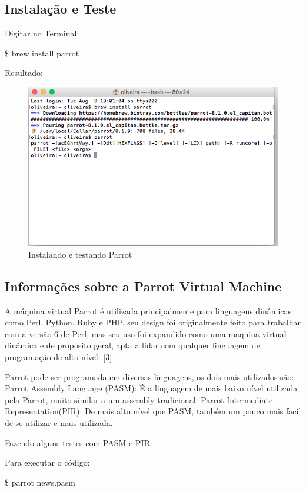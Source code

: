 \documentclass[12pt,a4paper,twoside]{report}
\begin{document}
\subsection{Instalação e Teste}
Digitar no Terminal:
\begin{terminal}
\$ brew install parrot
\end{terminal}
Resultado:
\begin{figure}[!ht]
\centering
\caption{Instalando e testando Parrot}
\includegraphics[scale=0.27]{imagens/brew-parrot.png}
\end{figure}
\subsection{Informações sobre a Parrot Virtual Machine}
A máquina virtual Parrot é utilizada principalmente para linguagens dinâmicas como Perl, Python, Ruby e PHP, seu design
foi originalmente feito para trabalhar com a versão 6 de Perl, mas seu uso foi expandido como uma maquina virtual dinâmica
e de proposito geral, apta a lidar com qualquer linguagem de programação de alto nível. [3]

Parrot pode ser programada em diversas linguagens, os dois mais utilizados são:
Parrot Assembly Language (PASM): É a linguagem de mais baixo nível utilizada pela Parrot, muito similar a um assembly tradicional.
Parrot Intermediate Representation(PIR): De mais alto nível que PASM, também um pouco mais facil de se utilizar e mais utilizada.

Fazendo alguns testes com PASM e PIR:

Para executar o código:
\begin{terminal}
\$ parrot news.pasm
\end{terminal}
\end{document}
